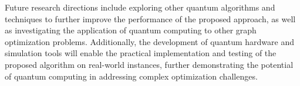 Future research directions include exploring other quantum algorithms and techniques to further improve the performance of the proposed approach, as well as investigating the application of quantum computing to other graph optimization problems. Additionally, the development of quantum hardware and simulation tools will enable the practical implementation and testing of the proposed algorithm on real-world instances, further demonstrating the potential of quantum computing in addressing complex optimization challenges.

